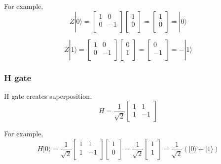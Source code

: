 For example,
$$ Z|0\rangle = \begin{bmatrix}
1 & 0 \\
0 & -1 \\
\end{bmatrix} 
\left[
\begin{array}{c}
1 \\
0 \\
\end{array}
\right]
= \left[
\begin{array}{c}
1 \\
0 \\
\end{array}
\right]
= |0\rangle
$$

$$ Z|1\rangle = \begin{bmatrix}
1 & 0 \\
0 & -1 \\
\end{bmatrix} 
\left[
\begin{array}{c}
0 \\
1  \\
\end{array}
\right]
= \left[
\begin{array}{c}
0 \\
-1 \\
\end{array}
\right]
= -|1\rangle
$$

\subsubsection{H gate}

H gate creates superposition.
$$ H = \frac{1}{\sqrt{2}}\begin{bmatrix}
1 & 1\\
1 & -1 \\
\end{bmatrix}
$$

For example,
$$ H|0\rangle = \frac{1}{\sqrt{2}}\begin{bmatrix}
1 & 1\\
1 & -1 \\
\end{bmatrix}\left[
\begin{array}{c}
1 \\
0 \\
\end{array}
\right]
= \frac{1}{\sqrt{2}} \left[
\begin{array}{c}
1 \\
1 \\
\end{array}
\right]
= \frac{1}{\sqrt{2}} (|0\rangle + |1\rangle)
$$


